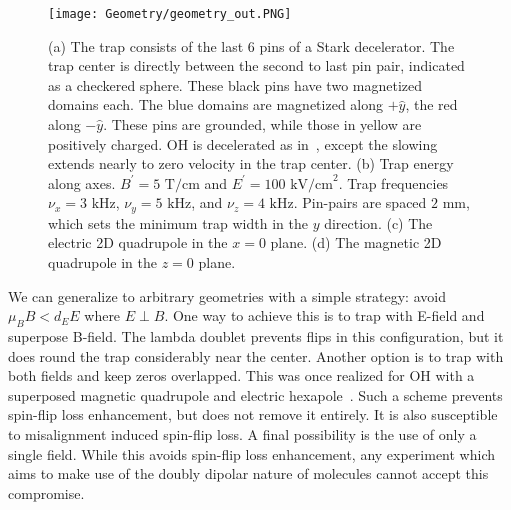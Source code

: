 \documentclass[%
 reprint,
groupedaddress,
 amsmath,amssymb,
 aps,
prl,
]{revtex4-1}
\newcommand{\epb}{$E\!\perp\!B$}
\begin{document}
\begin{figure}[tb]
\texttt{[image: Geometry/geometry\_out.PNG]}%
\caption{
(a) The trap consists of the last 6 pins of a Stark decelerator. The trap center is directly between the second to last pin pair, indicated as a checkered sphere. These black pins have two magnetized domains each. The blue domains are magnetized along $+\hat{y}$, the red along $-\hat{y}$. These pins are grounded, while those in yellow are positively charged. OH is decelerated as in~\cite{Sawyer2008}, except the slowing extends nearly to zero velocity in the trap center. (b) Trap energy along axes. $B^\prime=5\text{ T/cm}$ and $E^\prime=100 \text{ kV/cm}^2$. Trap frequencies $\nu_x=3\text{ kHz}$, $\nu_y=5\text{ kHz}$, and $\nu_z=4\text{ kHz}$. Pin-pairs are spaced $2\text{ mm}$, which sets the minimum trap width in the $y$ direction. (c) The electric 2D quadrupole in the $x=0$ plane. (d) The magnetic 2D quadrupole in the $z=0$ plane.
\label{fig:CAD}}
\end{figure}

We can generalize to arbitrary geometries with a simple strategy: avoid $\mu_BB < d_EE$ where \epb. One way to achieve this is to trap with E-field and superpose B-field. The lambda doublet prevents flips in this configuration, but it does round the trap considerably near the center. Another option is to trap with both fields and keep zeros overlapped. This was once realized for OH with a superposed magnetic quadrupole and electric hexapole~\cite{Sawyer2007}. Such a scheme prevents spin-flip loss enhancement, but does not remove it entirely. It is also susceptible to misalignment induced spin-flip loss. A final possibility is the use of only a single field. While this avoids spin-flip loss enhancement, any experiment which aims to make use of the doubly dipolar nature of molecules cannot accept this compromise.
\end{document}
